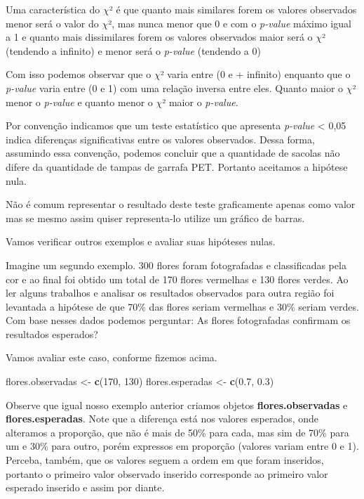 \documentclass[14pt,titlepage, oneside, openany, a4paper]{book}
\newenvironment{Shaded}{\begin{snugshade}}{\end{snugshade}}
\newcommand{\DecValTok}[1]{\textcolor[rgb]{0.00,0.00,0.81}{#1}}
\newcommand{\FloatTok}[1]{\textcolor[rgb]{0.00,0.00,0.81}{#1}}
\newcommand{\KeywordTok}[1]{\textcolor[rgb]{0.13,0.29,0.53}{\textbf{#1}}}
\newcommand{\NormalTok}[1]{#1}
\newcommand{\StringTok}[1]{\textcolor[rgb]{0.31,0.60,0.02}{#1}}
\begin{document}
Uma característica do \(\chi\)² é que quanto mais similares forem os valores observados menor será o valor do \(\chi\)², mas nunca menor que 0 e com o \emph{p-value} máximo igual a 1 e quanto mais dissimilares forem os valores observados maior será o \(\chi\)² (tendendo a infinito) e menor será o \emph{p-value} (tendendo a 0)

Com isso podemos observar que o \(\chi\)² varia entre (0 e + infinito) enquanto que o \emph{p-value} varia entre (0 e 1) com uma relação inversa entre eles. Quanto maior o \(\chi\)² menor o \emph{p-value} e quanto menor o \(\chi\)² maior o \emph{p-value}.

Por convenção indicamos que um teste estatístico que apresenta \emph{p-value} \textless{} 0,05 indica diferenças significativas entre os valores observados. Dessa forma, assumindo essa convenção, podemos concluir que a quantidade de sacolas não difere da quantidade de tampas de garrafa PET. Portanto aceitamos a hipótese nula.

Não é comum representar o resultado deste teste graficamente apenas como valor mas se mesmo assim quiser representa-lo utilize um gráfico de barras.

Vamos verificar outros exemplos e avaliar suas hipóteses nulas.

Imagine um segundo exemplo. 300 flores foram fotografadas e classificadas pela cor e ao final foi obtido um total de 170 flores vermelhas e 130 flores verdes. Ao ler alguns trabalhos e analisar os resultados observados para outra região foi levantada a hipótese de que 70\% das flores seriam vermelhas e 30\% seriam verdes. Com base nesses dados podemos perguntar: As flores fotografadas confirmam os resultados esperados?

Vamos avaliar este caso, conforme fizemos acima.

\begin{Shaded}
\begin{Highlighting}[]
\NormalTok{flores.observadas <-}\StringTok{ }\KeywordTok{c}\NormalTok{(}\DecValTok{170}\NormalTok{, }\DecValTok{130}\NormalTok{)}
\NormalTok{flores.esperadas <-}\StringTok{ }\KeywordTok{c}\NormalTok{(}\FloatTok{0.7}\NormalTok{, }\FloatTok{0.3}\NormalTok{)}
\end{Highlighting}
\end{Shaded}

Observe que igual nosso exemplo anterior criamos objetos \textbf{flores.observadas} e \textbf{flores.esperadas}. Note que a diferença está nos valores esperados, onde alteramos a proporção, que não é mais de 50\% para cada, mas sim de 70\% para um e 30\% para outro, porém expressos em proporção (valores variam entre 0 e 1). Perceba, também, que os valores seguem a ordem em que foram inseridos, portanto o primeiro valor observado inserido corresponde ao primeiro valor esperado inserido e assim por diante.
\end{document}
